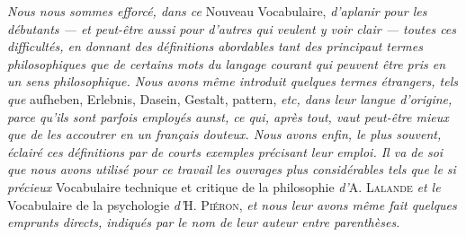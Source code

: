{\it Nous nous sommes efforcé, dans ce} Nouveau Vocabulaire, {\it d'aplanir pour
les débutants — et peut-être aussi pour d’autres qui veulent y voir clair — toutes
ces difficultés, en donnant des définitions abordables tant des principaut
termes philosophiques que de certains mots du langage courant qui peuvent
être pris en un sens philosophique. Nous avons même introduit quelques
termes étrangers, tels que} aufheben, Erlebnis, Dasein, Gestalt, pattern, {\it etc,
dans leur langue d’origine, parce qu’ils sont parfois employés aunst, ce qui,
après tout, vaut peut-être mieux que de les accoutrer en un français douteux.
Nous avons enfin, le plus souvent, éclairé ces définitions par de courts exemples
précisant leur emploi. Il va de soi que nous avons utilisé pour ce travail les
ouvrages plus considérables tels que le si précieux } Vocabulaire technique
et critique de la philosophie {\it d'}A. \textsc{Lalande} {\it et le} Vocabulaire de la psychologie
{\it d'}H. \textsc{Piéron}, {\it et nous leur avons même fait quelques emprunts directs,
indiqués par le nom de leur auteur entre parenthèses.}

